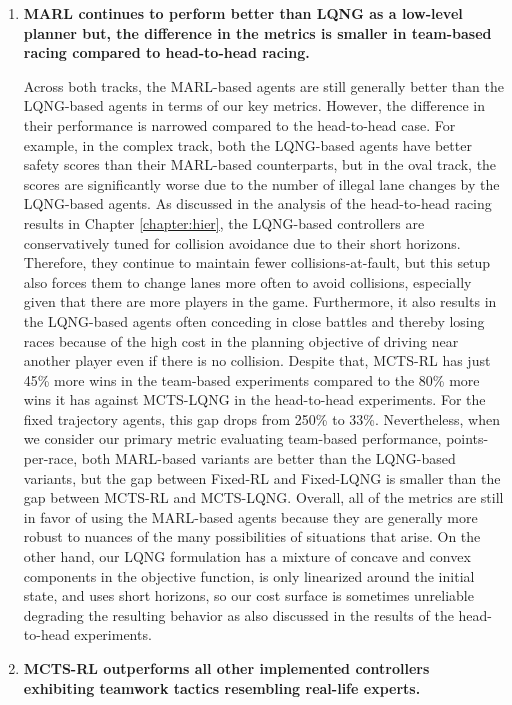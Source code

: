 \begin{enumerate}[wide, labelindent=0pt, font=\bfseries]
\item \textbf{MARL continues to perform better than LQNG as a low-level planner but, the difference in the metrics is smaller in team-based racing compared to head-to-head racing.}  

Across both tracks, the MARL-based agents are still generally better than the LQNG-based agents in terms of our key metrics. However, the difference in their performance is narrowed compared to the head-to-head case. For example, in the complex track, both the LQNG-based agents have better safety scores than their MARL-based counterparts, but in the oval track, the scores are significantly worse due to the number of illegal lane changes by the LQNG-based agents. As discussed in the analysis of the head-to-head racing results in Chapter \ref{chapter:hier}, the LQNG-based controllers are conservatively tuned for collision avoidance due to their short horizons. Therefore, they continue to maintain fewer collisions-at-fault, but this setup also forces them to change lanes more often to avoid collisions, especially given that there are more players in the game. Furthermore, it also results in the LQNG-based agents often conceding in close battles and thereby losing races because of the high cost in the planning objective of driving near another player even if there is no collision. Despite that, MCTS-RL has just 45\% more wins in the team-based experiments compared to the 80\% more wins it has against MCTS-LQNG in the head-to-head experiments. For the fixed trajectory agents, this gap drops from 250\% to 33\%. Nevertheless, when we consider our primary metric evaluating team-based performance, points-per-race, both MARL-based variants are better than the LQNG-based variants, but the gap between Fixed-RL and Fixed-LQNG is smaller than the gap between MCTS-RL and MCTS-LQNG. Overall, all of the metrics are still in favor of using the MARL-based agents because they are generally more robust to nuances of the many possibilities of situations that arise. On the other hand, our LQNG formulation has a mixture of concave and convex components in the objective function, is only linearized around the initial state, and uses short horizons, so our cost surface is sometimes unreliable degrading the resulting behavior as also discussed in the results of the head-to-head experiments.

\item \textbf{MCTS-RL outperforms all other implemented controllers exhibiting teamwork tactics resembling real-life experts.}  


\end{enumerate}
